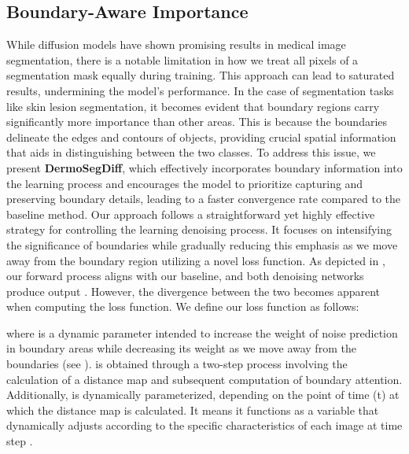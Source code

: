 \documentclass[runningheads]{llncs}
\begin{document}
\subsection{Boundary-Aware Importance}
While diffusion models have shown promising results in medical image segmentation, there is a notable limitation in how we treat all pixels of a segmentation mask equally during training. This approach can lead to saturated results, undermining the model's performance. In the case of segmentation tasks like skin lesion segmentation, it becomes evident that boundary regions carry significantly more importance than other areas. This is because the boundaries delineate the edges and contours of objects, providing crucial spatial information that aids in distinguishing between the two classes. To address this issue, we present \textbf{DermoSegDiff}, which effectively incorporates boundary information into the learning process and encourages the model to prioritize capturing and preserving boundary details, leading to a faster convergence rate compared to the baseline method. Our approach follows a straightforward yet highly effective strategy for controlling the learning denoising process. It focuses on intensifying the significance of boundaries while gradually reducing this emphasis as we move away from the boundary region utilizing a novel loss function. As depicted in , our forward process aligns with our baseline, and both denoising networks produce output . However, the divergence between the two becomes apparent when computing the loss function. We define our loss function as follows:

where  is a dynamic parameter intended to increase the weight of noise prediction in boundary areas while decreasing its weight as we move away from the boundaries (see ).  is obtained through a two-step process involving the calculation of a distance map and subsequent computation of boundary attention. Additionally,  is dynamically parameterized, depending on the point of time (t) at which the distance map is calculated. It means it functions as a variable that dynamically adjusts according to the specific characteristics of each image at time step .
\end{document}
